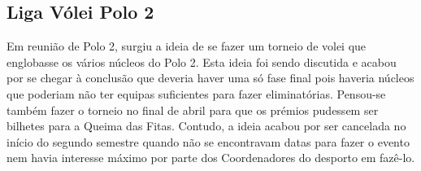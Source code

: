 
\subsection{Liga Vólei Polo 2}

Em reunião de Polo 2, surgiu a ideia de se fazer um torneio de volei que englobasse os vários núcleos do Polo 2. Esta ideia foi sendo discutida e acabou por se chegar à conclusão que deveria haver uma só fase final pois haveria núcleos que poderiam não ter equipas suficientes para fazer eliminatórias. Pensou-se também fazer o torneio no final de abril para que os prémios pudessem ser bilhetes para a Queima das Fitas. Contudo, a ideia acabou por ser cancelada no início do segundo semestre quando não se encontravam datas para fazer o evento nem havia interesse máximo por parte dos Coordenadores do desporto em fazê-lo.
